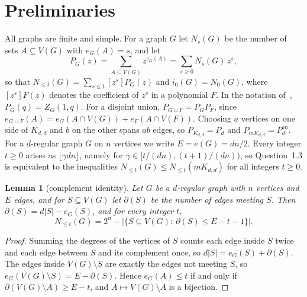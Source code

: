 \documentclass[11pt]{article}
\newtheorem{lemma}[theorem]{Lemma}
\theoremstyle{remark}
\newcommand{\Nle}[1]{N_{\le #1}}
\begin{document}
\FloatBarrier
\section{Preliminaries}\label{sec:prelim}
All graphs are finite and simple. For a graph $G$ let $N_s(G)$ be the number
of sets $A\subseteq V(G)$ with $e_G(A)=s$, and let
\[
 P_G(z)=\sum_{A\subseteq V(G)}z^{e_G(A)}=\sum_{s\ge0}N_s(G)\,z^s,
\]
so that $\Nle t(G)=\sum_{s\le t}[z^s]P_G(z)$ and $i_0(G)=N_0(G)$, where
$[z^s]F(z)$ denotes the coefficient of $z^s$ in a polynomial $F$. In the
notation of~\cite{car}, $P_G(q)=Z_G(1,q)$. For a disjoint union,
$P_{G\cup F}=P_GP_F$, since $e_{G\cup F}(A)=e_G(A\cap V(G))+e_F(A\cap V(F))$.
Choosing $a$ vertices on one side of $K_{d,d}$ and $b$ on the other spans
$ab$ edges, so $P_{K_{d,d}}=P_d$ and $P_{mK_{d,d}}=P_d^{\,m}$. For a
$d$-regular graph $G$ on $n$ vertices we write $E=e(G)=dn/2$. Every integer
$t\ge0$ arises as $\lfloor\gamma dn\rfloor$, namely for
$\gamma\in[t/(dn),(t+1)/(dn))$, so Question~1.3 is equivalent to the
inequalities $\Nle t(G)\le\Nle t(mK_{d,d})$ for all integers $t\ge0$.

\begin{lemma}[complement identity]\label{lem:complement}
Let $G$ be a $d$-regular graph with $n$ vertices and $E$ edges, and for
$S\subseteq V(G)$ let $\partial(S)$ be the number of edges meeting $S$. Then
$\partial(S)=d|S|-e_G(S)$, and for every integer $t$,
\[
 \Nle t(G)=2^n-\bigl|\{S\subseteq V(G):\ \partial(S)\le E-t-1\}\bigr|.
\]
\end{lemma}
\begin{proof}
Summing the degrees of the vertices of $S$ counts each edge inside $S$ twice
and each edge between $S$ and its complement once, so
$d|S|=e_G(S)+\partial(S)$. The edges inside $V(G)\setminus S$ are exactly the
edges not meeting $S$, so $e_G(V(G)\setminus S)=E-\partial(S)$. Hence
$e_G(A)\le t$ if and only if $\partial(V(G)\setminus A)\ge E-t$, and
$A\mapsto V(G)\setminus A$ is a bijection.
\end{proof}
\end{document}
